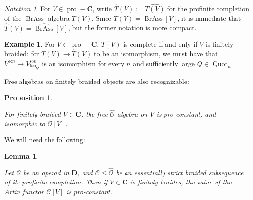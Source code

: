 \documentclass[12pt]{article}
\DeclareMathOperator{\Quot}{Quot}
\DeclareMathOperator{\pro}{pro}
\DeclareMathOperator{\BrAss}{BrAss}
\newcommand{\BrAsshat}{\widehat{\BrAss}} %
\newcommand{\That}{\widehat{T}}
\newcommand{\CC} {\mathcal{C}}
\newcommand{\bC} {\mathbf{C}}
\newcommand{\bD} {\mathbf{D}}
\newcommand{\proC}{\pro\!-\bC}
\newcommand{\OO}{\mathcal{O}}
\newcommand{\OOhat}{\widehat{\OO}}
\theoremstyle{plain}
\newtheorem{prop}[thm]{Proposition}
\newtheorem{lem}[thm]{Lemma}
\theoremstyle{definition}
\newtheorem{exmp}[thm]{Example}
\theoremstyle{remark}
\newtheorem{notation}[thm]{Notation}
\begin{document}
\begin{notation}

For $V \in \proC$, write $\That(V):= \widehat{T(V)}$ for the profinite completion of the $\BrAss$-algebra $T(V)$.  Since $T(V) = \BrAss[V]$, it is immediate that $\That(V) = \BrAsshat[V]$, but the former notation is more compact.

\end{notation}

\begin{exmp}

For $V \in \proC$, $T(V)$ is complete if and only if $V$ is finitely braided: for $T(V) \to \That(V)$ to be an isomorphism, we must have that $V^{\otimes n} \to V^{\otimes n}_{\ker_Q}$ is an isomorphism for every $n$ and sufficiently large $Q \in \Quot_n$.

\end{exmp}

Free algebras on finitely braided objects are also recognizable:

\begin{prop} \label{fin_br_same_monad_prop}

For finitely braided $V \in \bC$, the free $\OOhat$-algebra on $V$ is pro-constant, and isomorphic to $\OO[V]$. 

\end{prop}

We will need the following:

\begin{lem} \label{tech_const_lem}

Let $\OO$ be an operad in $\bD$, and $\CC \leq \OOhat$ be an essentially strict braided subsequence of its profinite completion.  Then if $V \in \bC$ is finitely braided, the value of the Artin functor $\CC[V]$ is pro-constant.

\end{lem}
\end{document}
